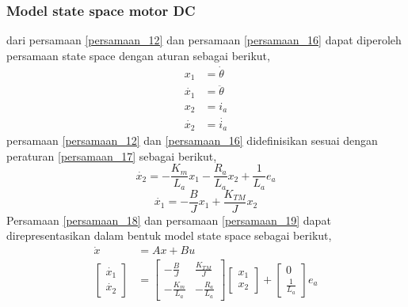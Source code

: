 \documentclass[../cover.tex]{subfiles}
\begin{document}
        \subsubsection{Model state space motor DC}
            dari persamaan \eqref{persamaan_12} dan persamaan \eqref{persamaan_16} dapat diperoleh persamaan state space dengan aturan sebagai berikut,
            \begin{equation}
                \begin{split}
                    x_1 &= \dot{\theta} \\[5pt]
                    \dot{x_1} &= \ddot{\theta} \\[5pt]
                    x_2 &= i_a \\[5pt]
                    \dot{x_2} &= \dot{i_a}
                    \label{persamaan_17}
                \end{split}
            \end{equation}
            persamaan \eqref{persamaan_12} dan \eqref{persamaan_16} didefinisikan sesuai dengan peraturan \eqref{persamaan_17} sebagai berikut,
            \begin{equation}
                \dot{x_2} = -\frac{K_m}{L_a}x_1 - \frac{R_a}{L_a}x_2 + \frac{1}{L_a}e_a
                \label{persamaan_18}
            \end{equation}
            \begin{equation}
                \dot{x_1} = -\frac{B}{J}x_1 + \frac{K_{TM}}{J}x_2
                \label{persamaan_19}
            \end{equation}
            Persamaan \eqref{persamaan_18} dan persamaan \eqref{persamaan_19} dapat direpresentasikan dalam bentuk model state space sebagai berikut\cite{Pal},
            \begin{equation}
                \begin{split}
                    \dot{x} &= Ax + Bu \\[5pt]
                    \begin{bmatrix} \dot{x_1} \\ \dot{x_2} \end{bmatrix} &= \begin{bmatrix} -\frac{B}{J} & \frac{K_{TM}}{J} \\ -\frac{K_m}{L_a} & -\frac{R_a}{L_a} \end{bmatrix} \begin{bmatrix}
                        x_1 \\ x_2 \end{bmatrix} + \begin{bmatrix}
                        0 \\ \frac{1}{L_a}\end{bmatrix}e_a
                \end{split}
            \end{equation}
\end{document}

